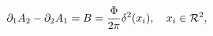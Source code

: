 \begin{equation}
\partial_1 A_2-\partial_2 A_1=B=
\frac{\Phi}{2\pi}\delta^{2}(x_i),\quad
x_i\in{\cal R}^2,
\label{avor}
\end{equation}

